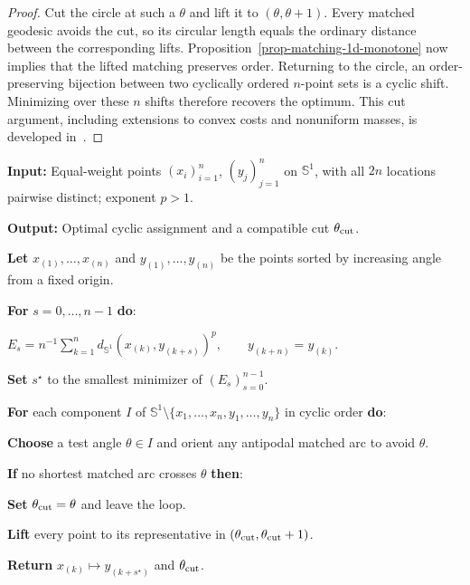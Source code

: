 \begin{proof}
	Cut the circle at such a $\theta$ and lift it to $(\theta,\theta+1)$. Every matched geodesic avoids the cut, so its circular length equals the ordinary distance between the corresponding lifts. Proposition~\ref{prop-matching-1d-monotone} now implies that the lifted matching preserves order. Returning to the circle, an order-preserving bijection between two cyclically ordered $n$-point sets is a cyclic shift. Minimizing over these $n$ shifts therefore recovers the optimum. This cut argument, including extensions to convex costs and nonuniform masses, is developed in~\cite{DelonRabinGousseau2011Circle,delon-circle}.
\end{proof}

\begin{alg}\label{alg:circle-cut-assignment}
\textbf{Input:} Equal-weight points $(x_i)_{i=1}^n$, $(y_j)_{j=1}^n$ on $\mathbb S^1$, with all $2n$ locations pairwise distinct; exponent $p>1$.

\textbf{Output:} Optimal cyclic assignment and a compatible cut $\theta_{\rm cut}$.

\textbf{Let} $x_{(1)},\ldots,x_{(n)}$ and $y_{(1)},\ldots,y_{(n)}$ be the points sorted by increasing angle from a fixed origin.

\textbf{For} $s=0,\ldots,n-1$ \textbf{do}:
\begin{algblock}
\(E_s=n^{-1}\sum_{k=1}^n d_{\mathbb S^1}\!\left(x_{(k)},y_{(k+s)}\right)^p, \qquad y_{(k+n)}=y_{(k)}\).
\end{algblock}
\textbf{Set} $s^\star$ to the smallest minimizer of $(E_s)_{s=0}^{n-1}$.

\textbf{For} each component $I$ of $\mathbb S^1\setminus\{x_1,\ldots,x_n,y_1,\ldots,y_n\}$ in cyclic order \textbf{do}:
\begin{algblock}
\textbf{Choose} a test angle $\theta\in I$ and orient any antipodal matched arc to avoid $\theta$.

\textbf{If} no shortest matched arc crosses $\theta$ \textbf{then}:
\begin{algblock}
\textbf{Set} $\theta_{\rm cut}=\theta$ and leave the loop.
\end{algblock}
\end{algblock}

\textbf{Lift} every point to its representative in $(\theta_{\rm cut},\theta_{\rm cut}+1)$.

\textbf{Return} $x_{(k)}\mapsto y_{(k+s^\star)}$ and $\theta_{\rm cut}$.
\end{alg}

